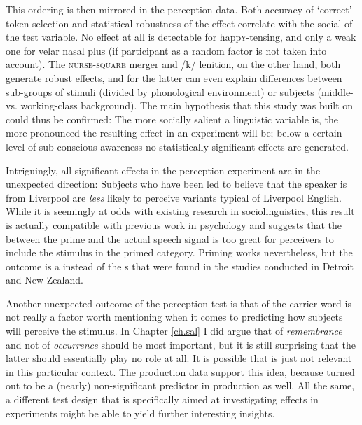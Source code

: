 \newpage 
This ordering is then mirrored in the perception data.
Both accuracy of `correct' token selection and statistical robustness of the  effect correlate with the social  of the test variable.
No effect at all is detectable for happ\textsc{y}-tensing, and only a weak one for velar nasal plus (if participant as a random factor is not taken into account).
The \textsc{nurse}-\textsc{square} merger and /k/ lenition, on the other hand, both generate robust  effects, and for the latter  can even explain differences between sub-groups of stimuli (divided by phonological environment) or subjects (middle- vs. working-class background).
The main hypothesis that this study was built on could thus be confirmed: The more socially salient a linguistic variable is, the more pronounced the resulting effect in an   experiment will be; below a certain level of sub-conscious awareness no statistically significant  effects are generated.

Intriguingly, all significant effects in the perception experiment are in the unexpected direction: Subjects who have been led to believe that the speaker is from Liverpool are \emph{less} likely to perceive variants typical of Liverpool English.
While it is seemingly at odds with existing  research in sociolinguistics, this result is actually compatible with previous work in psychology and suggests that the  between the prime and the actual speech signal is too great for perceivers to include the stimulus in the primed category.
Priming works nevertheless, but the outcome is a  instead of the s that were found in the studies conducted in Detroit and New Zealand.

Another unexpected outcome of the perception test is that  of the carrier word is not really a factor worth mentioning when it comes to predicting how subjects will perceive the stimulus.
In Chapter \ref{ch.sal} I did argue that  of \emph{remembrance} and not  of \emph{occurrence} should be most important, but it is still surprising that the latter should essentially play no role at all.
It is possible that  is just not relevant in this particular context.
The production data support this idea, because  turned out to be a (nearly) non-significant predictor in production as well.
All the same, a different test design that is specifically aimed at investigating  effects in  experiments might be able to yield further interesting insights.

